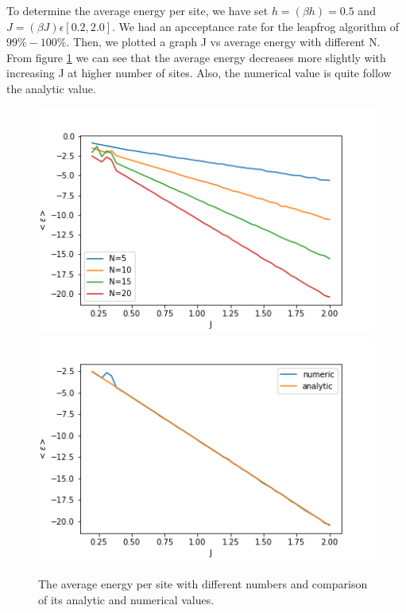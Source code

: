 \documentclass[11pt, a4paper, DIV=12]{scrartcl}
\begin{document}
To determine the average energy per site, we have set $ h=(\beta h)= 0.5 $ and $ J=(\beta J) \epsilon[0.2, 2.0] $. We had an apcceptance rate for the leapfrog algorithm of $99\%-100\%$. Then, we plotted a graph J vs average energy with different N. From figure \ref{fig:AEnergy} we can see that the average energy decreases more slightly with increasing J at higher number of sites. Also, the numerical value is quite follow the analytic value.
\begin{figure}[H]
	\centering
	\includegraphics[width=0.6\linewidth]{energy.png}\includegraphics[width=0.6\linewidth]{energy_comparison.png}
	\caption{The average energy per site with different numbers and comparison of its analytic and numerical values.}
	\label{fig:AEnergy}
\end{figure}
\end{document}
